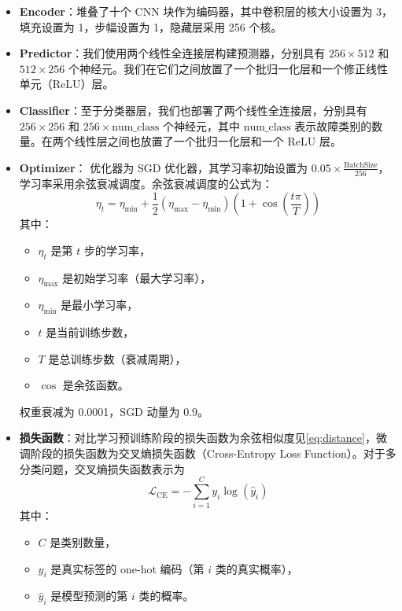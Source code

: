 \documentclass[master]{thesis-uestc}
\begin{document}
\begin{itemize}
    \item \textbf{Encoder}：堆叠了十个 CNN 块作为编码器，其中卷积层的核大小设置为 3，填充设置为 1，步幅设置为 1，隐藏层采用 256 个核。
    
    \item \textbf{Predictor}：我们使用两个线性全连接层构建预测器，分别具有 \( 256 \times 512 \) 和 \( 512 \times 256 \) 个神经元。我们在它们之间放置了一个批归一化层和一个修正线性单元（ReLU）层。

    \item \textbf{Classifier}：至于分类器层，我们也部署了两个线性全连接层，分别具有 \( 256 \times 256 \) 和 \( 256 \times \text{num\_class} \) 个神经元，其中 \(\text{num\_class}\) 表示故障类别的数量。在两个线性层之间也放置了一个批归一化层和一个 ReLU 层。

    \item \textbf{Optimizer}：
        优化器为 SGD 优化器，其学习率初始设置为 \( 0.05 \times \frac{\text{BatchSize}}{256} \)，学习率采用余弦衰减调度。余弦衰减调度的公式为：
        \[
        \eta_t = \eta_{\text{min}} + \frac{1}{2} (\eta_{\text{max}} - \eta_{\text{min}}) \left(1 + \cos\left(\frac{t \pi}{T}\right)\right)
        \]
        其中：
        \begin{itemize}
            \item \(\eta_t\) 是第 \(t\) 步的学习率，
            \item \(\eta_{\text{max}}\) 是初始学习率（最大学习率），
            \item \(\eta_{\text{min}}\) 是最小学习率，
            \item \(t\) 是当前训练步数，
            \item \(T\) 是总训练步数（衰减周期），
            \item \(\cos\) 是余弦函数。
        \end{itemize}
        权重衰减为 0.0001，SGD 动量为 0.9。

    \item \textbf{损失函数}：对比学习预训练阶段的损失函数为余弦相似度见\ref{eq:distance}，微调阶段的损失函数为交叉熵损失函数（Cross-Entropy Loss Function）。对于多分类问题，交叉熵损失函数表示为
    \begin{equation}
        \mathcal{L}_{\text{CE}} = -\sum_{i=1}^{C} y_i \log(\hat{y}_i)
        \end{equation}        
        其中：
        \begin{itemize}
            \item \( C \) 是类别数量，
            \item \( y_i \) 是真实标签的 one-hot 编码（第 \( i \) 类的真实概率），
            \item \( \hat{y}_i \) 是模型预测的第 \( i \) 类的概率。
        \end{itemize}


\end{itemize}
\end{document}
